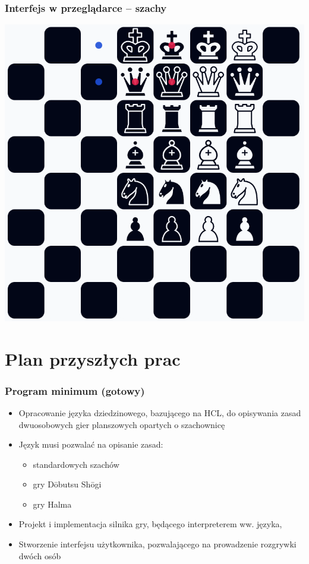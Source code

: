 \documentclass{beamer}
\begin{document}
\begin{frame}
	\frametitle{Interfejs w przeglądarce -- szachy}
	\centering
	\includegraphics[height=0.85\textheight]{chess-browser.png}
\end{frame}

\section{Plan przyszłych prac}

\begin{frame}
	\frametitle{Program minimum (gotowy)}
	\begin{itemize}
		\item Opracowanie języka dziedzinowego, bazującego na HCL, do opisywania zasad dwuosobowych gier planszowych opartych o szachownicę
		\item Język musi pozwalać na opisanie zasad:
		      \begin{itemize}
			      \item standardowych szachów
			      \item gry Dōbutsu Shōgi
			      \item gry Halma
		      \end{itemize}
		\item Projekt i implementacja silnika gry, będącego interpreterem ww. języka,
		\item Stworzenie interfejsu użytkownika, pozwalającego na prowadzenie rozgrywki dwóch osób
	\end{itemize}
\end{frame}
\end{document}
